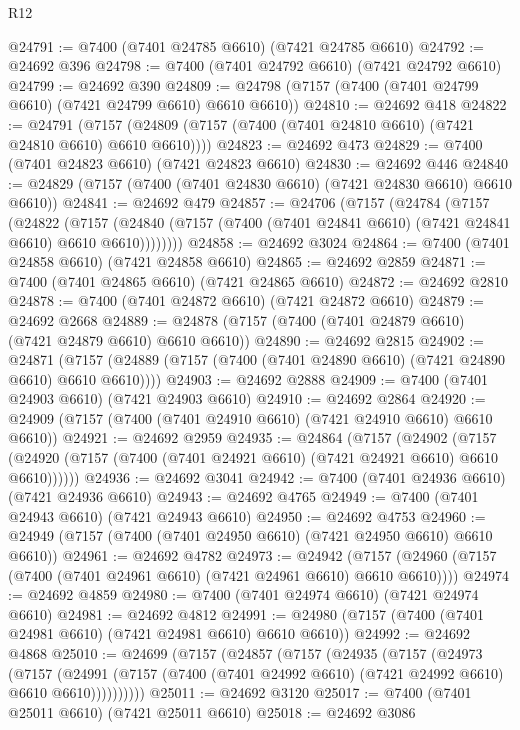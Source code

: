 \begin{lexlean}{R12}
\begin{coremodule}
{{{{{{{{{{{{{{{{{{{{{{{{{{{{{{{{{{{{{{{{{{{{{{{{{{{{{{{{{{{{{{{{{{{{{{{{{{{{{{{{{{@24791 := @7400 (@7401 @24785 @6610) (@7421 @24785 @6610)
@24792 := @24692 @396
@24798 := @7400 (@7401 @24792 @6610) (@7421 @24792 @6610)
@24799 := @24692 @390
@24809 := @24798 (@7157 (@7400 (@7401 @24799 @6610) (@7421 @24799 @6610) @6610 @6610))
@24810 := @24692 @418
@24822 := @24791
    (@7157 (@24809 (@7157 (@7400 (@7401 @24810 @6610) (@7421 @24810 @6610) @6610 @6610))))
@24823 := @24692 @473
@24829 := @7400 (@7401 @24823 @6610) (@7421 @24823 @6610)
@24830 := @24692 @446
@24840 := @24829 (@7157 (@7400 (@7401 @24830 @6610) (@7421 @24830 @6610) @6610 @6610))
@24841 := @24692 @479
@24857 := @24706
    (@7157
      (@24784
        (@7157
          (@24822
            (@7157
              (@24840 (@7157 (@7400 (@7401 @24841 @6610) (@7421 @24841 @6610) @6610 @6610))))))))
@24858 := @24692 @3024
@24864 := @7400 (@7401 @24858 @6610) (@7421 @24858 @6610)
@24865 := @24692 @2859
@24871 := @7400 (@7401 @24865 @6610) (@7421 @24865 @6610)
@24872 := @24692 @2810
@24878 := @7400 (@7401 @24872 @6610) (@7421 @24872 @6610)
@24879 := @24692 @2668
@24889 := @24878 (@7157 (@7400 (@7401 @24879 @6610) (@7421 @24879 @6610) @6610 @6610))
@24890 := @24692 @2815
@24902 := @24871
    (@7157 (@24889 (@7157 (@7400 (@7401 @24890 @6610) (@7421 @24890 @6610) @6610 @6610))))
@24903 := @24692 @2888
@24909 := @7400 (@7401 @24903 @6610) (@7421 @24903 @6610)
@24910 := @24692 @2864
@24920 := @24909 (@7157 (@7400 (@7401 @24910 @6610) (@7421 @24910 @6610) @6610 @6610))
@24921 := @24692 @2959
@24935 := @24864
    (@7157
      (@24902
        (@7157 (@24920 (@7157 (@7400 (@7401 @24921 @6610) (@7421 @24921 @6610) @6610 @6610))))))
@24936 := @24692 @3041
@24942 := @7400 (@7401 @24936 @6610) (@7421 @24936 @6610)
@24943 := @24692 @4765
@24949 := @7400 (@7401 @24943 @6610) (@7421 @24943 @6610)
@24950 := @24692 @4753
@24960 := @24949 (@7157 (@7400 (@7401 @24950 @6610) (@7421 @24950 @6610) @6610 @6610))
@24961 := @24692 @4782
@24973 := @24942
    (@7157 (@24960 (@7157 (@7400 (@7401 @24961 @6610) (@7421 @24961 @6610) @6610 @6610))))
@24974 := @24692 @4859
@24980 := @7400 (@7401 @24974 @6610) (@7421 @24974 @6610)
@24981 := @24692 @4812
@24991 := @24980 (@7157 (@7400 (@7401 @24981 @6610) (@7421 @24981 @6610) @6610 @6610))
@24992 := @24692 @4868
@25010 := @24699
    (@7157
      (@24857
        (@7157
          (@24935
            (@7157
              (@24973
                (@7157
                  (@24991
                    (@7157 (@7400 (@7401 @24992 @6610) (@7421 @24992 @6610) @6610 @6610))))))))))
@25011 := @24692 @3120
@25017 := @7400 (@7401 @25011 @6610) (@7421 @25011 @6610)
@25018 := @24692 @3086
}}}}}}}}}}}}}}}}}}}}}}}}}}}}}}}}}}}}}}}}}}}}}}}}}}}}}}}}}}}}}}}}}}}}}}}}}}}}}}}}}}
\end{coremodule}
\end{lexlean}
